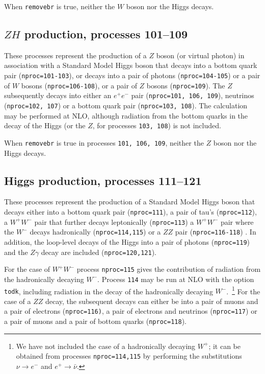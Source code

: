 \documentclass[12pt]{article}
\begin{document}
When {\tt removebr} is true, neither the $W$ boson nor the Higgs decays.

\subsection{$ZH$ production, processes 101--109}
\label{subsec:zh}

These processes represent the production of a $Z$ boson (or virtual photon)
in association with a Standard Model Higgs boson that
decays into a bottom quark pair ({\tt nproc=101-103}),
or decays into a pair of photons ({\tt nproc=104-105}) 
or a pair of $W$ bosons ({\tt nproc=106-108}),
or a pair of $Z$ bosons ({\tt nproc=109}). 
The $Z$ subsequently decays into 
either an $e^+ e^-$ pair ({\tt nproc=101, 106, 109}), neutrinos ({\tt nproc=102, 107})
or a bottom quark pair ({\tt nproc=103, 108}).
The calculation may be performed at NLO, although radiation from the
bottom quarks in the decay of the Higgs (or the $Z$, for processes
{\tt 103, 108}) is not included.

When {\tt removebr} is true in processes {\tt 101, 106, 109}, neither the $Z$ boson
nor the Higgs decays.

\subsection{Higgs production, processes 111--121}
\label{subsec:h}

These processes represent the production of a Standard Model Higgs
boson that decays either into a bottom quark
pair ({\tt nproc=111}), a pair of tau's ({\tt nproc=112}), 
a $W^+W^-$ 
pair that further decays leptonically ({\tt nproc=113}) 
a $W^+W^-$ pair where the $W^-$ decays hadronically ({\tt nproc=114,115}) 
or a $ZZ$ pair ({\tt nproc=116-118}) . In addition, the loop-level decays of the Higgs 
into a pair of photons ({\tt nproc=119}) and the $Z\gamma$ decay are included
({\tt nproc=120,121}).

For the case of $W^+W^-$ process {\tt nproc=115} gives the contribution 
of radiation from the hadronically decaying $W^-$.
Process {\tt 114} may be run at NLO with the option {\tt todk},
including radiation in the decay of the hadronically decaying $W^-$.~\footnote{
We have not included the case of a hadronically decaying $W^+$; it can
be obtained from processes {\tt nproc=114,115} by performing the
substitutions $\nu \to e^-$ and $e^+ \to \bar{\nu}$.}
For the case of a $ZZ$ decay,
the subsequent decays can either be into a pair of muons and a pair of electrons
({\tt nproc=116)}, a pair of electrons and neutrinos ({\tt nproc=117}) or
a pair of muons and a pair of bottom quarks ({\tt nproc=118}).
\end{document}
